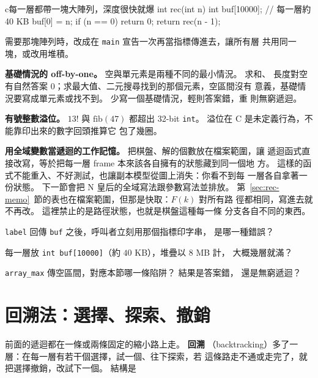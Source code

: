 \begin{code}{c}{每一層都帶一塊大陣列，深度很快就爆}
int rec(int n) {
    int buf[10000];    // 每一層約 40 KB
    buf[0] = n;
    if (n == 0) {
        return 0;
    }
    return rec(n - 1);
}
\end{code}

需要那塊陣列時，改成在 \texttt{main} 宣告一次再當指標傳進去，讓所有層
共用同一塊，或改用堆積。

\textbf{基礎情況的 off-by-one。} 空與單元素是兩種不同的最小情況。 求和、
長度對空有自然答案 $0$；求最大值、二元搜尋找到的那個元素，空區間沒有
意義，基礎情況要寫成單元素或找不到。 少寫一個基礎情況，輕則答案錯，重
則無窮遞迴。

\textbf{有號整數溢位。} $13!$ 與 $\mathrm{fib}(47)$ 都超出 32-bit
\texttt{int}。 溢位在 C 是未定義行為，不能靠印出來的數字回頭推算它
包了幾圈。

\textbf{用全域變數當遞迴的工作記憶。} 把棋盤、解的個數放在檔案範圍，讓
遞迴函式直接改寫，等於把每一層 frame 本來該各自擁有的狀態藏到同一個地
方。 這樣的函式不能重入、不好測試，也讓副本模型從圖上消失：你看不到每
一層各自拿著一份狀態。 下一節會把 N 皇后的全域寫法跟參數寫法並排放。
第~\ref{sec:rec-memo}~節的表也在檔案範圍，但那是快取：$F(k)$ 對所有路
徑都相同，寫進去就不再改。 這裡禁止的是路徑狀態，也就是棋盤這種每一條
分支各自不同的東西。


\begin{drills}[label=drills:rec-pitfalls]
\item \texttt{label} 回傳 \texttt{buf} 之後，呼叫者立刻用那個指標印字串，
是哪一種錯誤？
\item 每一層放 \texttt{int buf[10000]}（約 $40$ KB），堆疊以 $8$ MB 計，
大概幾層就滿？
\item \texttt{array\_max} 傳空區間，對應本節哪一條陷阱？ 結果是答案錯，
還是無窮遞迴？
\end{drills}

\section{回溯法：選擇、探索、撤銷}
\label{sec:rec-backtrack}

前面的遞迴都在一條或兩條固定的縮小路上走。 \textbf{回溯}
（backtracking）多了一層：在每一層有若干個選擇，試一個、往下探索，若
這條路走不通或走完了，就把選擇撤銷，改試下一個。 結構是

